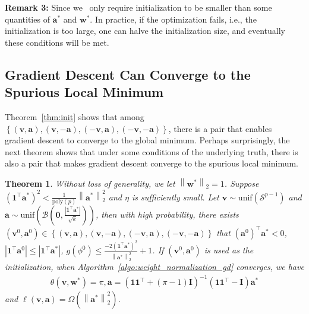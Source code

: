 \documentclass{article}
\newcommand{\poly}{\mathrm{poly}}
\newcommand{\unif}{\mathrm{unif}}
\newcommand{\firstlayer}{w}
\newcommand{\firstlayerWN}{v}
\newcommand{\secondlayer}{a}
\newcommand{\mat}[1]{\mathbf{#1}}
\newcommand{\vect}[1]{\mathbf{#1}}
\newcommand{\norm}[1]{\left\|#1\right\|}
\newcommand{\abs}[1]{\left|#1\right|}
\newtheorem{thm}{Theorem}[section]
\begin{document}
\noindent\textbf{Remark 3:} Since we  only require initialization to be smaller than some quantities of $\vect{a}^*$ and $\vect{w}^*$. In practice, if the optimization fails, i.e., the initialization is too large, one can halve the initialization size, and eventually these conditions will be met. 

\subsection{Gradient Descent Can Converge to the Spurious Local Minimum}
Theorem~\ref{thm:init} shows that among $\left\{\left(\vect{\firstlayerWN},\vect{\secondlayer}\right), \left(\vect{\firstlayerWN},-\vect{\secondlayer}\right), \left(-\vect{\firstlayerWN},\vect{\secondlayer}\right), \left(-\vect{\firstlayerWN},-\vect{\secondlayer}\right)  \right\}$, there is a  pair that enables gradient descent to converge to the global minimum. 
Perhaps surprisingly, the next theorem shows that under some conditions of the underlying truth, there is also a pair that makes gradient descent converge to the spurious local minimum.

\begin{thm}\label{thm:w_norm_1_gd_converge_bad}
Without loss of generality, we let $\norm{\vect{\firstlayer}^*}_2=1$.
Suppose $\left(\vect{1}^\top \vect{\secondlayer}^*\right)^2 < \frac{1}{\poly(p)}\norm{\vect{\secondlayer}^*}_2^2$ and $\eta$ is sufficiently small.
Let $\vect{\firstlayerWN} \sim \unif\left(\mathcal{S}^{p-1}\right)$ and $\vect{\secondlayer} \sim \unif\left( \mathcal{B}\left(\vect{0},\frac{\abs{\vect{1}^\top\vect{\secondlayer}^*}}{\sqrt{k}}\right)\right)$, then with high probability, there exists $\left(\vect{\firstlayerWN}^0,\vect{\secondlayer}^0\right) \in \left\{\left(\vect{\firstlayerWN},\vect{\secondlayer}\right), \left(\vect{\firstlayerWN},-\vect{\secondlayer}\right), \left(-\vect{\firstlayerWN},\vect{\secondlayer}\right), \left(-\vect{\firstlayerWN},-\vect{\secondlayer}\right)  \right\}$ that $\left(\vect{\secondlayer}^0\right)^\top \vect{\secondlayer}^* < 0$, $\abs{ \vect{1}^\top\vect{\secondlayer}^0}\le \abs{\vect{1}^\top \vect{\secondlayer}^*}$, $g\left(\phi^0\right) \le  \frac{-2\left(\vect{1}^\top\vect{\secondlayer}^*\right)^2}{\norm{\vect{\secondlayer}^*}_2^2} + 1$. 
If $\left(\vect{\firstlayerWN}^0,\vect{\secondlayer}^0\right)$ is used as the initialization, when  Algorithm~\ref{algo:weight_normalization_gd} converges, we have
\begin{align*}
\theta\left(\vect{\firstlayerWN},\vect{\firstlayer}^*\right) = \pi, 
\vect{\secondlayer} = \left(\vect{1}\vect{1}^\top + \left(\pi-1\right)\mat{I}\right)^{-1}\left(\vect{1}\vect{1}^\top - \mat{I}\right)\vect{\secondlayer}^* 
\end{align*} and
$\ell\left(\vect{\firstlayerWN},\vect{\secondlayer}\right) = \Omega\left(\norm{\vect{\secondlayer}^*}_2^2\right)$.
\end{thm}
\end{document}
